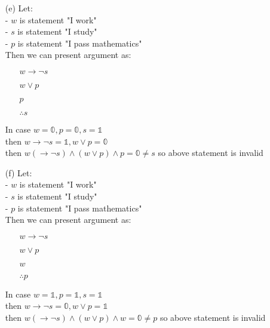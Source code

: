 \begin{enumerate}
    \newpage
    \item[(e)] Let: \\
        - $w$ is statement "I work" \\
        - $s$ is statement "I study" \\
        - $p$ is statement "I pass mathematics" \\
        Then we can present argument as:
        \begin{enumerate}
            \item[] $w \rightarrow \neg s$
            \item[] $w \lor p$
            \item[] $p$
            \item[] $\therefore s$
        \end{enumerate}
        In case $w=\mathbb{0}, p=\mathbb{0}, s=\mathbb{1}$ \\
        then $w\rightarrow \neg s = \mathbb{1}, w\lor p = \mathbb{0}$ \\
        then $w(\rightarrow \neg s) \land (w\lor p) \land p = \mathbb{0} \neq s$ so above statement is invalid
    
    \item[(f)] Let: \\
        - $w$ is statement "I work" \\
        - $s$ is statement "I study" \\
        - $p$ is statement "I pass mathematics" \\
        Then we can present argument as:
        \begin{enumerate}
            \item[] $w \rightarrow \neg s$
            \item[] $w \lor p$
            \item[] $w$
            \item[] $\therefore p$
        \end{enumerate}
        In case $w=\mathbb{1}, p=\mathbb{1}, s=\mathbb{1}$ \\
        then $w\rightarrow \neg s = \mathbb{0}, w\lor p = \mathbb{1}$ \\
        then $w(\rightarrow \neg s) \land (w\lor p) \land w = \mathbb{0} \neq p$ so above statement is invalid
\end{enumerate}

